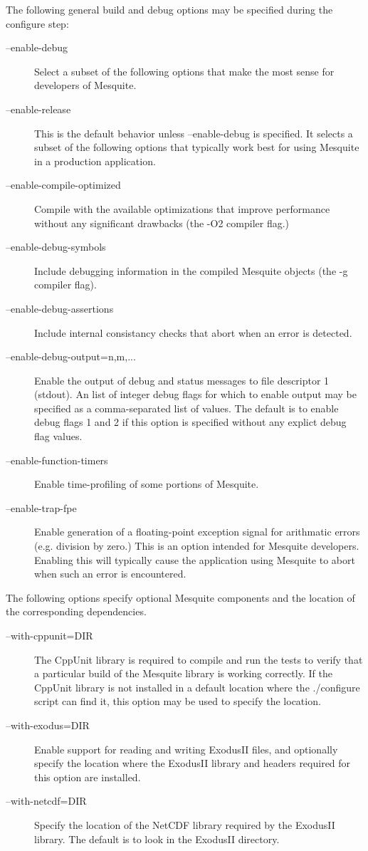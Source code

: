\label{config_options}
The following general build and debug options may be specified during the configure step:
\begin{description}
\item[--enable-debug]  Select a subset of the following options that
make the most sense for developers of Mesquite.
\item[--enable-release]  This is the default behavior unless 
--enable-debug is specified.  It selects a subset of the following options that
typically work best for using Mesquite in a production application.
\item[--enable-compile-optimized] Compile with the available 
optimizations that improve performance without any significant drawbacks 
(the -O2 compiler flag.)
\item[--enable-debug-symbols] Include debugging information in
the compiled Mesquite objects (the -g compiler flag).
\item[--enable-debug-assertions]  Include internal consistancy 
checks that abort when an error is detected.
\item[--enable-debug-output=n,m,...]  Enable the output of
debug and status messages to file descriptor 1 (stdout).  An 
list of integer debug flags for which to enable output may be specified 
as a comma-separated list of values.  The default is to enable debug
flags 1 and 2 if this option is specified without any explict debug
flag values.
\item[--enable-function-timers]  Enable time-profiling of
some portions of Mesquite.
\item[--enable-trap-fpe]  Enable generation of a floating-point
exception signal for arithmatic errors (e.g. division by zero.)  This is
an option intended for Mesquite developers.  Enabling this will typically cause
the application using Mesquite to abort when such an error is encountered.
\end{description}

The following options specify optional Mesquite components and the location 
of the corresponding dependencies.
\begin{description}
\item[--with-cppunit=DIR]  The CppUnit library is required to compile
and run the tests to verify that a particular build of the Mesquite library
is working correctly.  If the CppUnit library is not installed in a default location
where the ./configure script can find it, this option may be used to specify
the location.
\item[--with-exodus=DIR]  Enable support for reading and writing
ExodusII files, and optionally specify the location where the ExodusII library
and headers required for this option are installed.
\item[--with-netcdf=DIR]  Specify the location of the NetCDF library
required by the ExodusII library.  The default is to look in the ExodusII
directory.
\end{description}

